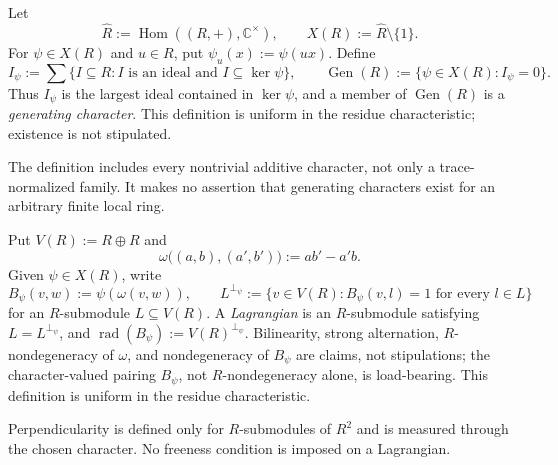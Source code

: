 
\begin{definition}
\label{def:local-generating-character}
Let
\[
 \widehat R:=\operatorname{Hom}((R,+),\mathbb C^\times),
 \qquad X(R):=\widehat R\setminus\{1\}.
\]
For $\psi\in X(R)$ and $u\in R$, put $\psi_u(x):=\psi(ux)$.  Define
\[
 I_\psi:=\sum\{I\subseteq R:I\text{ is an ideal and }I\subseteq\ker\psi\},
 \qquad
 \operatorname{Gen}(R):=\{\psi\in X(R):I_\psi=0\}.
\]
Thus $I_\psi$ is the largest ideal contained in $\ker\psi$, and a member of
$\operatorname{Gen}(R)$ is a \emph{generating character}.  This definition
is uniform in the residue characteristic; existence is not stipulated.
\end{definition}

\begin{scope}
The definition includes every nontrivial additive character, not only a
trace-normalized family.  It makes no assertion that generating characters
exist for an arbitrary finite local ring.
\end{scope}


\begin{definition}
\label{def:local-symplectic-module}
Put $V(R):=R\oplus R$ and
\[
 \omega\big((a,b),(a',b')\big):=ab'-a'b.
\]
Given $\psi\in X(R)$, write
\[
 B_\psi(v,w):=\psi(\omega(v,w)),
 \qquad
 L^{\perp_\psi}:=\{v\in V(R):B_\psi(v,l)=1
                         \text{ for every }l\in L\}
\]
for an $R$-submodule $L\subseteq V(R)$.  A \emph{Lagrangian} is an
$R$-submodule satisfying $L=L^{\perp_\psi}$, and
$\operatorname{rad}(B_\psi):=V(R)^{\perp_\psi}$.  Bilinearity, strong
alternation, $R$-nondegeneracy of $\omega$, and nondegeneracy of $B_\psi$
are claims, not stipulations; the character-valued pairing $B_\psi$, not
$R$-nondegeneracy alone, is load-bearing.  This definition is uniform in
the residue characteristic.
\end{definition}

\begin{scope}
Perpendicularity is defined only for $R$-submodules of $R^2$ and is measured
through the chosen character.  No freeness condition is imposed on a
Lagrangian.
\end{scope}


